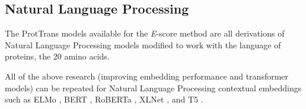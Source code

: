 \documentclass[
	letterpaper, %
	10pt, %
]{journalArticle}
\begin{document}
\subsection{Natural Language Processing}
The ProtTrans models available for the \textit{E}-score method are all derivations of Natural Language Processing models modified to work with the language of proteins, the 20 amino acids.

All of the above research (improving embedding performance and transformer models) can be repeated for Natural Language Processing contextual embeddings such as ELMo \autocite{Peters:2018}, BERT \autocite{Devlin:2018}, RoBERTa \autocite{Liu:2019}, XLNet \autocite{Yang:2022}, and T5 \autocite{Raffel:2020}. 

\printbibliography %

\end{document}
